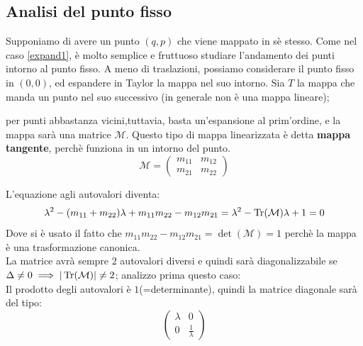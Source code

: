 \documentclass[a4paper,12pt]{article}
\theoremstyle{plain}
\theoremstyle{definition}
\newcommand{\Op}[1]{\mathcal{#1}}
\newcommand{\f}[2]{\frac{#1}{#2}}
\theoremstyle{remark}
\begin{document}
\subsection{Analisi del punto fisso}
Supponiamo di avere un punto $(q,p)$ che viene mappato in sè stesso. Come nel caso \ref{expand1}, è molto semplice e fruttuoso studiare l'andamento dei punti intorno al punto fisso. A meno di traslazioni, possiamo considerare il punto fisso in $(0,0)$, ed espandere in Taylor la mappa nel suo intorno.
Sia $T$ la mappa che manda un punto nel suo successivo (in generale non è una mappa lineare);

per punti abbastanza vicini,tuttavia, basta un'espansione al prim'ordine, e la mappa sarà una matrice $\Op{M}$. Questo tipo di mappa linearizzata è detta \textbf{mappa tangente}, perchè funziona in un intorno del punto.\\
\[\Op{M}=\begin{pmatrix}
m_{11}&m_{12}\\
m_{21}& m_{22}
\end{pmatrix}\]

L'equazione agli autovalori diventa:
\[\lambda^2-(m_{11}+m_{22})\lambda+m_{11}m_{22}-m_{12}m_{21}=\lambda^2-\Tr(\Op{M})\lambda+1=0		\]
Dove si è usato il fatto che $m_{11}m_{22}-m_{12}m_{21}=\det(\Op{M})=1$ perchè la mappa è una trasformazione canonica.\\
La matrice avrà sempre $2$ autovalori diversi e quindi sarà diagonalizzabile se $\Delta\ne 0\implies |\Tr(\Op{M})|\ne2$; analizzo prima questo caso:\\
Il prodotto degli autovalori è $1$(=determinante), quindi la matrice diagonale sarà del tipo:
\[\begin{pmatrix}
\lambda&0\\
0&\f{1}{\lambda}
\end{pmatrix}\]
\end{document}
